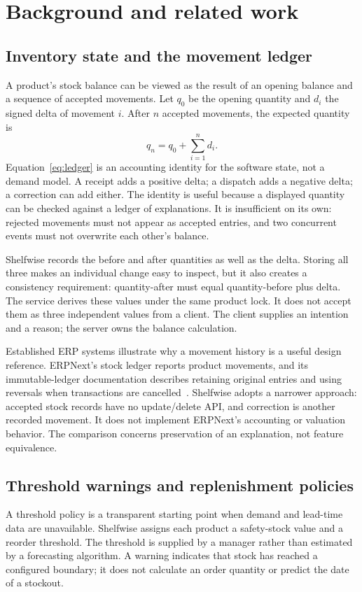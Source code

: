 \chapter{Background and related work}\label{ch:background}
\section{Inventory state and the movement ledger}
A product's stock balance can be viewed as the result of an opening balance and a sequence of accepted movements. Let $q_0$ be the opening quantity and $d_i$ the signed delta of movement $i$. After $n$ accepted movements, the expected quantity is
\begin{equation}\label{eq:ledger}
 q_n=q_0+\sum_{i=1}^{n}d_i.
\end{equation}
Equation~\ref{eq:ledger} is an accounting identity for the software state, not a demand model. A receipt adds a positive delta; a dispatch adds a negative delta; a correction can add either. The identity is useful because a displayed quantity can be checked against a ledger of explanations. It is insufficient on its own: rejected movements must not appear as accepted entries, and two concurrent events must not overwrite each other's balance.

Shelfwise records the before and after quantities as well as the delta. Storing all three makes an individual change easy to inspect, but it also creates a consistency requirement: quantity-after must equal quantity-before plus delta. The service derives these values under the same product lock. It does not accept them as three independent values from a client. The client supplies an intention and a reason; the server owns the balance calculation.

Established ERP systems illustrate why a movement history is a useful design reference. ERPNext's stock ledger reports product movements, and its immutable-ledger documentation describes retaining original entries and using reversals when transactions are cancelled~\citep{erpnext-stock,erpnext}. Shelfwise adopts a narrower approach: accepted stock records have no update/delete API, and correction is another recorded movement. It does not implement ERPNext's accounting or valuation behavior. The comparison concerns preservation of an explanation, not feature equivalence.

\section{Threshold warnings and replenishment policies}
A threshold policy is a transparent starting point when demand and lead-time data are unavailable. Shelfwise assigns each product a safety-stock value and a reorder threshold. The threshold is supplied by a manager rather than estimated by a forecasting algorithm. A warning indicates that stock has reached a configured boundary; it does not calculate an order quantity or predict the date of a stockout.


